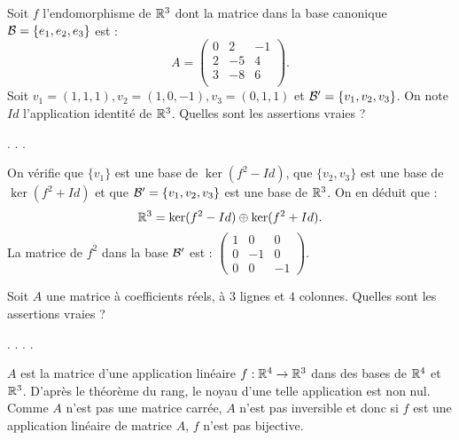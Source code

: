 \begin{question}
Soit $f$ l'endomorphisme de $\mathbb{R}^3$ dont la matrice dans la base canonique ${\cal B}=\{e_1,e_2,e_3\}$ est : 
$$A = \left(\begin{array}{rcc}
0&2&-1\\
2&-5&4\\ 
3&-8&6\\
\end{array}\right).$$
Soit $v_1=(1,1,1), v_2=(1,0,-1),  v_3=(0,1,1)$ et ${\cal B}' = \{ v_1, v_2,  v_3\}$. On note $Id$ l'application identité de $\mathbb{R}^3$. 
Quelles sont les assertions vraies ?
\begin{answers}  
.
.
.
\end{answers}
\begin{explanations} On vérifie que  
$\{v_1\}$ est une base de $\ker (f^2-Id)$, que  
$\{v_2 ,v_3\}$ est une base de $\ker (f^2+Id)$ et que  ${\cal B}' = \{ v_1, v_2,  v_3\}$ est une base de $\mathbb{R}^3$.
On en déduit que :
$$\mathbb{R}^3=\ker (f^2-Id) \oplus \ker (f^2+Id).$$
La matrice de $f^2$ dans la base ${\cal B}'$ est : $\left(\begin{array}{rcc} 1&0&0\\ 0 &-1&0\\ 
0&0&-1\end{array}\right)$.
\end{explanations}
\end{question}


\begin{question}
Soit $A$ une matrice à coefficients réels, à $3$ lignes et $4$ colonnes. Quelles sont les assertions vraies ?
\begin{answers} 
.
.
.
.
\end{answers}
\begin{explanations} $A$ est la matrice d'une application linéaire $f: \mathbb{R}^4 \to \mathbb{R}^3$ dans des bases de $\mathbb{R}^4$ et
$\mathbb{R}^3$. D'après le théorème du rang, le noyau d'une telle application est non nul.
\vskip0mm
Comme $A$ n'est pas une matrice carrée, $A$ n'est pas inversible et donc si $f$ est une application linéaire de matrice
$A$, $f$ n'est pas bijective.
\end{explanations}
\end{question}


